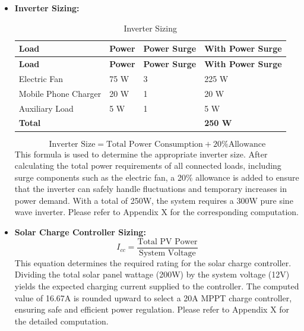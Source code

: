 {\begin{itemize}
	\item \textbf{Inverter Sizing:} 
	\begin{longtable}{p{4cm} p{2cm} p{2.5cm} p{4cm}}
		\caption{Inverter Sizing} \label{tab:InverterSizing} \\
		\toprule
		\textbf{Load} & \textbf{Power} & \textbf{Power Surge} & \textbf{With Power Surge} \\
		\midrule
		\endfirsthead
		
		\toprule
		\textbf{Load} & \textbf{Power} & \textbf{Power Surge} & \textbf{With Power Surge} \\
		\midrule
		\endhead
		
		\bottomrule
		\endfoot
		
		Electric Fan & 75 W & 3 & 225 W \\
		Mobile Phone Charger & 20 W & 1 & 20 W \\
		Auxiliary Load & 5 W & 1 & 5 W \\
		\midrule
		\textbf{Total} & & & \textbf{250 W} \\
	\end{longtable}
	\begin{equation}
		\text{Inverter Size} =
		\text{Total Power Consumption} + 20\% \text{Allowance}
		\label{eq:inverter}
	\end{equation}
	This formula is used to determine the appropriate inverter size. After calculating the total power requirements of all connected loads, including surge components such as the electric fan, a 20\% allowance is added to ensure that the inverter can safely handle fluctuations and temporary increases in power demand. With a total of 250W, the system requires a 300W pure sine wave inverter. Please refer to Appendix X for the corresponding computation.
	
	\item \textbf{Solar Charge Controller Sizing:} 
	\begin{equation}
		I_{cc} =
		\frac{\text{Total PV Power}}{\text{System Voltage}}
		\label{eq:solar}
	\end{equation}
	This equation determines the required rating for the solar charge controller. Dividing the total solar panel wattage (200W) by the system voltage (12V) yields the expected charging current supplied to the controller. The computed value of 16.67A is rounded upward to select a 20A MPPT charge controller, ensuring safe and efficient power regulation. Please refer to Appendix X for the detailed computation.
	
\end{itemize}




}
